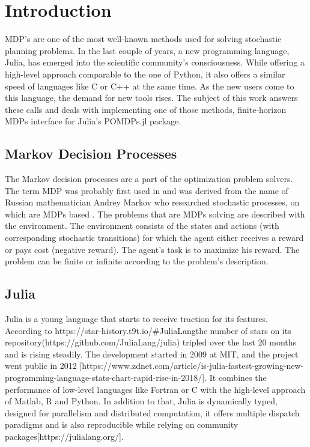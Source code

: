 
\chapter{Introduction}

MDP's are one of the most well-known methods used for solving stochastic planning problems. In the last couple of years, a new programming language, Julia, has emerged into the scientific community's consciousness. While offering a high-level approach comparable to the one of Python, it also offers a similar speed of languages like C or C++ at the same time. As the new users come to this language, the demand for new tools rises. The subject of this work answers these calls and deals with implementing one of those methods, finite-horizon MDPs interface for Julia's POMDPs.jl package.

\section{Markov Decision Processes}
The Markov decision processes are a part of the optimization problem solvers.
The term MDP was probably first used in \cite{cite:1} and was derived from the name of Russian mathematician Andrey Markov who researched stochastic processes, on which are MDPs based \cite{wiki:1}.
The problems that are MDPs solving are described with the environment. The environment consists of the states and actions (with corresponding stochastic transitions) for which the agent either receives a reward or pays cost (negative reward). The agent's task is to maximize his reward. The problem can be finite or infinite according to the problem's description.

\section{Julia}
Julia is a young language that starts to receive traction for its features. According to https://star-history.t9t.io/#JuliaLang\julia the number of stars on its repository(https://github.com/JuliaLang/julia) tripled over the last 20 months and is rising steadily.
The development started in 2009 at MIT, and the project went public in 2012 [https://www.zdnet.com/article/is-julia-fastest-growing-new-programming-language-stats-chart-rapid-rise-in-2018/]. 
It combines the performance of low-level languages like Fortran or C with the high-level approach of Matlab, R and Python. In addition to that, Julia is dynamically typed, designed for parallelism and distributed computation, it offers multiple dispatch paradigms and is also reproducible while relying on community packages[https://julialang.org/].



